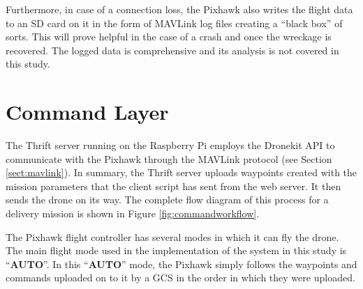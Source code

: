 Furthermore, in case of a connection loss, the Pixhawk also writes the flight data to an SD card on it in the form of MAVLink log files creating a “black box” of sorts. This will prove helpful in the case of a crash and once the wreckage is recovered. The logged data is comprehensive and its analysis is not covered in this study.



\section{Command Layer}\label{sect:commandlayer}
The Thrift server running on the Raspberry Pi employs the Dronekit API to communicate with the Pixhawk through the MAVLink protocol (see Section \ref{sect:mavlink}). In summary, the Thrift server uploads waypoints created with the mission parameters that the client script has sent from the web server. It then sends the drone on its way. The complete flow diagram of this process for a delivery mission is shown in Figure \ref{fig:commandworkflow}.

The Pixhawk flight controller has several modes in which it can fly the drone. The main flight mode used in the implementation of the system in this study is ``\textbf{AUTO}''. In this ``\textbf{AUTO}'' mode, the Pixhawk simply follows the waypoints and commands uploaded on to it by a GCS in the order in which they were uploaded.

